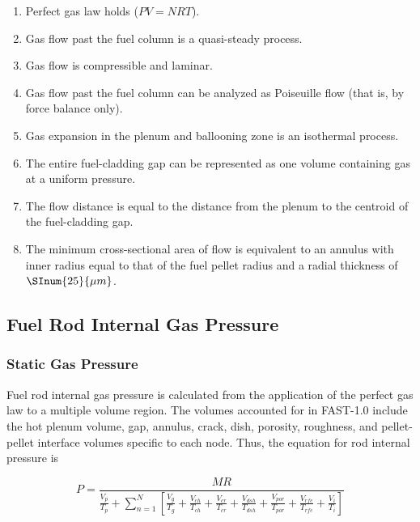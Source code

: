 \begin{enumerate} \def\labelenumi{\arabic{enumi}.}
    \item Perfect gas law holds ($PV = NRT$).
    \item Gas flow past the fuel column is a quasi-steady process.
    \item Gas flow is compressible and laminar.
    \item Gas flow past the fuel column can be analyzed as Poiseuille flow (that is, by force balance
        only).
    \item Gas expansion in the plenum and ballooning zone is an isothermal process.
    \item The entire fuel-cladding gap can be represented as one volume containing gas at a uniform
        pressure.
    \item The flow distance is equal to the distance from the plenum to the centroid of the
        fuel-cladding gap.
    \item The minimum cross-sectional area of flow is equivalent to an annulus with inner radius equal
        to that of the fuel pellet radius and a radial thickness of $\SInum{25}{\mu m}$.
\end{enumerate}
\subsection{Fuel Rod Internal Gas Pressure}
\subsubsection{Static Gas Pressure}\label{section:static-gas-pressure}

Fuel rod internal gas pressure is calculated from the application of the perfect gas law to a
multiple volume region. The volumes accounted for in FAST-1.0 include the hot plenum volume, gap,
annulus, crack, dish, porosity, roughness, and pellet-pellet interface volumes specific to each
node. Thus, the equation for rod internal pressure is

\begin{equation}
    \label{eq:rod_internal_pressure}
    P = \frac{MR}{\frac{V_{p}}{T_{p}} + \sum_{n = 1}^{N}\left\lbrack \frac{V_{g}}{T_{g}} + \frac{V_{ch}}{T_{ch}} + \frac{V_{cr}}{T_{cr}} + \frac{V_{dsh}}{T_{dsh}} + \frac{V_{por}}{T_{por}} + \frac{V_{rfc}}{T_{rfc}} + \frac{V_{i}}{T_{i}} \right\rbrack}
\end{equation}

